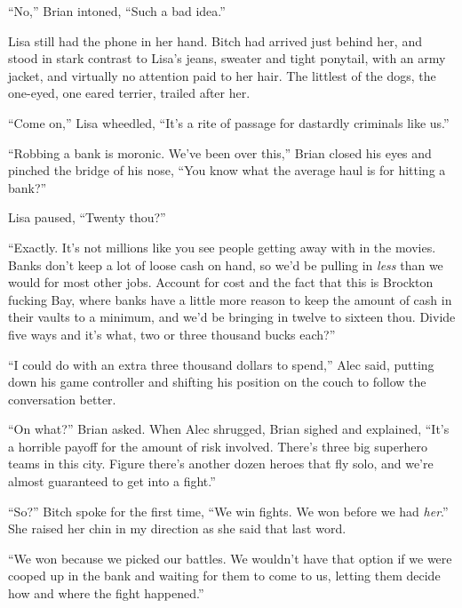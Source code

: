 





``No,'' Brian intoned, ``Such a bad idea.''



Lisa still had the phone in her hand.  Bitch had arrived just behind her, and stood in stark contrast to Lisa's jeans, sweater and tight ponytail, with an army jacket, and virtually no attention paid to her hair.  The littlest of the dogs, the one-eyed, one eared terrier, trailed after her.



``Come on,'' Lisa wheedled, ``It's a rite of passage for dastardly criminals like us.''



``Robbing a bank is moronic.  We've been over this,''  Brian closed his eyes and pinched the bridge of his nose, ``You know what the average haul is for hitting a bank?''



Lisa paused, ``Twenty thou?''



``Exactly.  It's not millions like you see people getting away with in the movies.  Banks don't keep a lot of loose cash on hand, so we'd be pulling in \emph{less} than we would for most other jobs.  Account for cost and the fact that this is Brockton fucking Bay, where banks have a little more reason to keep the amount of cash in their vaults to a minimum, and we'd be bringing in twelve to sixteen thou.  Divide five ways and it's what, two or three thousand bucks each?''



``I could do with an extra three thousand dollars to spend,'' Alec said, putting down his game controller and shifting his position on the couch to follow the conversation better.



``On what?'' Brian asked.  When Alec shrugged, Brian sighed and explained, ``It's a horrible payoff for the amount of risk involved.  There's three big superhero teams in this city.  Figure there's another dozen heroes that fly solo, and we're almost guaranteed to get into a fight.''



``So?'' Bitch spoke for the first time, ``We win fights.  We won before we had \emph{her}.''  She raised her chin in my direction as she said that last word.



``We won because we picked our battles.  We wouldn't have that option if we were cooped up in the bank and waiting for them to come to us, letting them decide how and where the fight happened.''



